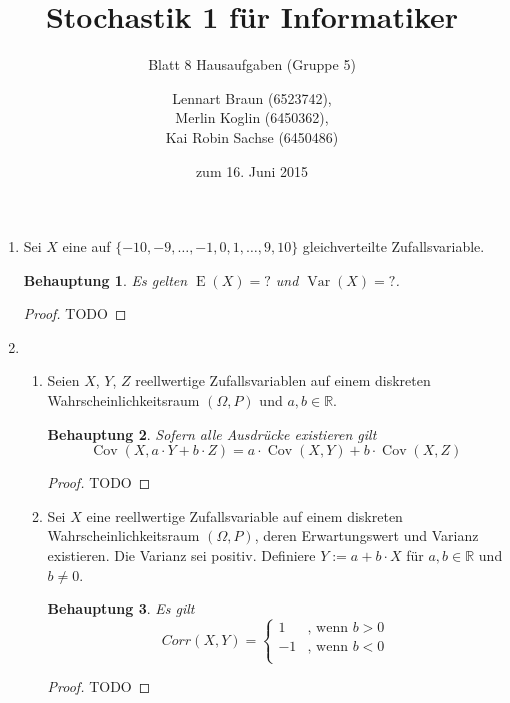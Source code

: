 \documentclass[a4paper]{scrartcl}
\title{Stochastik 1 für Informatiker}
\subtitle{Blatt 8 Hausaufgaben (Gruppe 5)}
\author{
    Lennart Braun (6523742), \\
    Merlin Koglin (6450362), \\
    Kai Robin Sachse (6450486)
}
\date{zum 16. Juni 2015}
\newtheorem*{behaupt}{Behauptung}
\newcommand{\cov}{\operatorname{Cov}}
\newcommand{\e}{\operatorname{E}}
\newcommand{\var}{\operatorname{Var}}
\begin{document}
\maketitle

\begin{enumerate}[label=\bfseries\arabic*.]
    \item
        Sei $X$ eine auf $\{-10, -9, \ldots, -1, 0, 1, \ldots, 9, 10\}$
        gleichverteilte Zufallsvariable.
        \begin{behaupt}
            Es gelten $\e(X) = ?$ und $\var(X) = ?$.
        \end{behaupt}
        \begin{proof}
            TODO
        \end{proof}

    \item
        \begin{enumerate}[label=(\alph*)]
            \item
                Seien $X$, $Y$, $Z$ reellwertige Zufallsvariablen auf einem
                diskreten Wahrscheinlichkeitsraum $(\Omega, P)$ und
                $a, b \in \mathbb{R}$.
                \begin{behaupt}
                    Sofern alle Ausdrücke existieren gilt
                    \begin{equation*}
                        \cov(X, a \cdot Y + b \cdot Z)
                        = a \cdot \cov(X, Y) + b \cdot \cov(X, Z)
                    \end{equation*}
                \end{behaupt}
                \begin{proof}
                    TODO
                \end{proof}

            \item
                Sei $X$ eine reellwertige Zufallsvariable auf einem diskreten
                Wahrscheinlichkeitsraum $(\Omega, P)$, deren Erwartungswert und
                Varianz existieren.
                Die Varianz sei positiv.
                Definiere $Y := a + b \cdot X$ für $a, b \in \mathbb{R}$ und
                $b \neq 0$.
                \begin{behaupt}
                    Es gilt
                    \begin{equation*}
                        Corr(X, Y) =
                        \begin{cases}
                             1 & \text{, wenn } b > 0 \\
                            -1 & \text{, wenn } b < 0 \\
                        \end{cases}
                    \end{equation*}
                \end{behaupt}
                \begin{proof}
                    TODO
                \end{proof}


\end{enumerate}
\end{enumerate}
\end{document}
